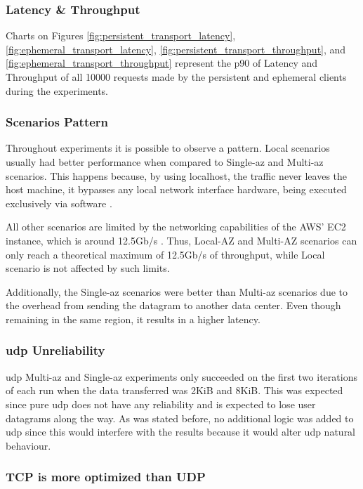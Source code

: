 \subsubsection{Latency \& Throughput}

Charts on Figures \ref{fig:persistent_transport_latency}, \ref{fig:ephemeral_transport_latency}, \ref{fig:persistent_transport_throughput}, and \ref{fig:ephemeral_transport_throughput} represent the \gls{p90} of Latency and Throughput of all 10000 requests made by the persistent and ephemeral clients during the experiments.

\subsubsection*{Scenarios Pattern}

Throughout experiments it is possible to observe a pattern. Local scenarios usually had better performance when compared to Single-\gls{az} and Multi-\gls{az} scenarios. This happens because, by using localhost, the traffic never leaves the host machine, it bypasses any local network interface hardware, being executed exclusively via software \cite{rfc4291}.

All other scenarios are limited by the networking capabilities of the AWS' EC2 instance, which is around 12.5Gb/s \cite{m6i_xlarge_aws_ec2}. Thus, Local-AZ and Multi-AZ scenarios can only reach a theoretical maximum of 12.5Gb/s of throughput, while Local scenario is not affected by such limits.

Additionally, the Single-\gls{az} scenarios were better than Multi-\gls{az} scenarios due to the overhead from sending the datagram to another data center. Even though remaining in the same region, it results in a higher latency.

\subsubsection*{\gls{udp} Unreliability}

\gls{udp} Multi-\gls{az} and Single-\gls{az} experiments only succeeded on the first two iterations of each run when the data transferred was 2KiB and 8KiB. This was expected since pure \gls{udp} does not have any reliability and is expected to lose user datagrams along the way. As was stated before, no additional logic was added to \gls{udp} since this would interfere with the results because it would alter \gls{udp} natural behaviour.

\subsubsection*{TCP is more optimized than UDP}

